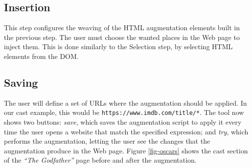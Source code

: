 \documentclass[runningheads]{llncs}
\begin{document}
\subsection{Insertion}

This step configures the weaving of the HTML augmentation elements built in the previous step. The user must choose the wanted places in the Web page to inject them. This is done similarly to the Selection step, by selecting HTML elements from the DOM.



\subsection{Saving}



The user will define a set of URLs where the augmentation should be applied. In our cast example, this would be \texttt{https://www.imdb.com/title/*}. The tool now shows two buttons: \textit{save}, which saves the augmentation script to apply it every time the user opens a website that match the specified expression; and \textit{try}, which performs the augmentation, letting the user see the changes that the augmentation produce in the Web page. Figure \ref{fig-oscars} shows the cast section of the \textit{``The Godfather''} page before and after the augmentation.





\end{document}
